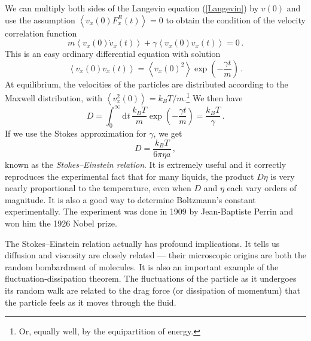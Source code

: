 \documentclass{article}
\theoremstyle{plain}\theoremheaderfont{\normalfont\bfseries}\theorembodyfont{\rmfamily}\theoremseparator{.}\newtheorem*{thm}{Theorem}\newtheorem*{law}{Law}\newtheorem*{pos}{Postulate}
\numberwithin{equation}{section}
\newcommand{\dd}[2][]{\mathrm{d}^{#1} #2\,}
\newcommand{\eval}[1]{\left\langle #1 \right\rangle}
\begin{document}
    We can multiply both sides of the Langevin equation (\ref{Langevin}) by \(v(0)\) and use the assumption \(\eval{v_x(0)F_x^R(t)}=0\) to obtain the condition of the velocity correlation function
    \begin{equation}
        m\eval{v_x(0)\dot{v}_x(t)}+\gamma\eval{v_x(0)v_x(t)}=0\,.
    \end{equation}
    This is an easy ordinary differential equation with solution
    \begin{equation}
        \eval{v_x(0)v_x(t)}=\eval{v_x(0)^2}\exp\left(-\frac{\gamma t}{m}\right)\,.
    \end{equation} 
    At equilibrium, the velocities of the particles are distributed according to the Maxwell distribution, with \(\eval{v_x^2(0)}=k_B T/m\).\footnote{Or, equally well, by the equipartition of energy.} We then have
    \begin{equation}
        D=\int_{0}^{\infty}\dd{t}\frac{k_B T}{m}\exp\left(-\frac{\gamma t}{m}\right)=\frac{k_B T}{\gamma}\,.
    \end{equation}
    If we use the Stokes approximation for \(\gamma\), we get
    \begin{equation}
        D=\frac{k_B T}{6\pi\eta a}\,,
    \end{equation}
    known as the \textit{Stokes--Einstein relation}. It is extremely useful and it correctly reproduces the experimental fact that for many liquids, the product \(D\eta\) is very nearly proportional to the temperature, even when \(D\) and \(\eta\) each vary orders of magnitude. It is also a good way to determine Boltzmann's constant experimentally. The experiment was done in 1909 by Jean-Baptiste Perrin and won him the 1926 Nobel prize.

    The Stokes--Einstein relation actually has profound implications. It tells us diffusion and viscosity are closely related --- their microscopic origins are both the random bombardment of molecules. It is also an important example of the fluctuation-dissipation theorem. The fluctuations of the particle as it undergoes its random walk are related to the drag force (or dissipation of momentum) that the particle feels as it moves through the fluid.
\end{document}
